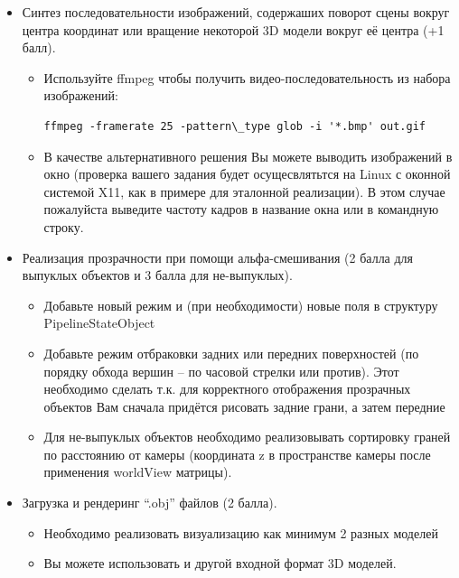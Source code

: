 \documentclass[12pt,subf,href,colorlinks=true]{article}
\begin{document}
\begin{itemize}
	
	\item Синтез последовательности изображений, содержаших поворот сцены вокруг центра координат или вращение некоторой 3D модели вокруг её центра (+1 балл). 
  
    \begin{itemize}
    \item Используйте ffmpeg чтобы получить видео-последовательность из набора изображений:
    \begin{verbatim}ffmpeg -framerate 25 -pattern\_type glob -i '*.bmp' out.gif \end{verbatim}
    
    \item В качестве альтернативного решения Вы можете выводить изображений в окно (проверка вашего задания будет осущесвлятьтся на Linux с оконной системой X11, как в примере для эталонной реализации). В этом случае пожалуйста выведите частоту кадров в название окна или в командную строку.
    \end{itemize}
    
    \item Реализация прозрачности при помощи альфа-смешивания (2 балла для выпуклых объектов и 3 балла для не-выпуклых).
    
    \begin{itemize}
    	\item Добавьте новый режим и (при необходимости) новые поля в структуру \newline PipelineStateObject
    	
    	\item Добавьте режим отбраковки задних или передних поверхностей (по порядку обхода вершин -- по часовой стрелки или против). Этот необходимо сделать т.к. для корректного отображения прозрачных объектов Вам сначала придётся рисовать задние грани, а затем передние
    	
    	\item Для не-выпуклых объектов необходимо реализовывать сортировку граней по расстоянию от камеры (координата z в пространстве камеры после применения worldView матрицы). 
    \end{itemize}
    
	\item Загрузка и рендеринг ``.obj'' файлов (2 балла).
    \begin{itemize}
    	\item Необходимо реализовать визуализацию как минимум 2 разных моделей
    	\item Вы можете использовать и другой входной формат 3D моделей.
    \end{itemize}		
		

\end{itemize}
\end{document}

